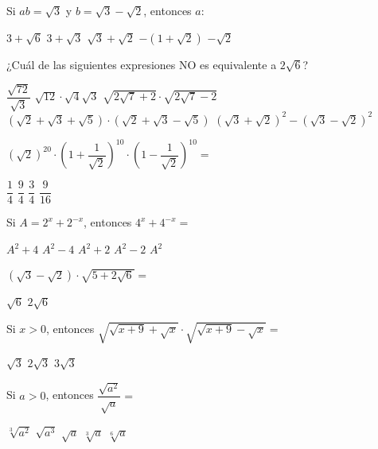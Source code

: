 \documentclass[pagina vacia]{srs}
\begin{document}
\begin{preguntas}
\pregunta Si \(ab = \sqrt{3}\) y \(b = \sqrt{3} - \sqrt{2}\), entonces \(a:\)
\begin{vertical}
\alternativa \(3 + \sqrt{6}\)
\alternativa \(3 + \sqrt{3}\)
\alternativa \(\sqrt{3} + \sqrt{2}\)
\alternativa \(-(1 + \sqrt{2})\)
\alternativa \(-\sqrt{2}\)
\end{vertical}

\pregunta ¿Cuál de las siguientes expresiones NO es equivalente a \(2\sqrt{6}\)?
\begin{vertical}
\alternativa \(\dfrac{\sqrt{72}}{\sqrt{3}}\)
\alternativa \(\sqrt{12} \cdot \sqrt{4}\sqrt{3}\)
\alternativa \(\sqrt{2\sqrt{7}+2} \cdot \sqrt{2\sqrt{7}-2}\)
\alternativa \((\sqrt{2}+\sqrt{3}+\sqrt{5}) \cdot (\sqrt{2}+\sqrt{3}-\sqrt{5})\)
\alternativa \((\sqrt{3}+\sqrt{2})^2 - (\sqrt{3}-\sqrt{2})^2\)
\end{vertical}

\pregunta \((\sqrt{2})^{20} \cdot \left(1 + \dfrac{1}{\sqrt{2}}\right)^{10} \cdot \left(1 - \dfrac{1}{\sqrt{2}}\right)^{10} =\)
\begin{vertical}
\alternativa \(\dfrac{1}{4}\)
\alternativa \(\dfrac{9}{4}\)
\alternativa \(\dfrac{3}{4}\)
\alternativa \(\dfrac{9}{16}\)
\end{vertical}

\pregunta Si \(A = 2^x + 2^{-x}\), entonces \(4^x + 4^{-x} =\)
\begin{vertical}
\alternativa \(A^2 + 4\)
\alternativa \(A^2 - 4\)
\alternativa \(A^2 + 2\)
\alternativa \(A^2 - 2\)
\alternativa \(A^2\)
\end{vertical}

\pregunta \((\sqrt{3}-\sqrt{2})\cdot\sqrt{5 + 2\sqrt{6}} =\)
\begin{vertical}
\alternativa \(\sqrt{6}\)
\alternativa \(2\sqrt{6}\)
\end{vertical}

\pregunta Si \(x > 0\), entonces \(\sqrt{\sqrt{x+9}+\sqrt{x}} \cdot \sqrt{\sqrt{x+9}-\sqrt{x}} =\)
\begin{vertical}
\alternativa \(\sqrt{3}\)
\alternativa \(2\sqrt{3}\)
\alternativa \(3\sqrt{3}\)
\end{vertical}

\pregunta Si \(a > 0\), entonces \(\dfrac{\sqrt{a^2}}{\sqrt{a}} =\)
\begin{vertical}
\alternativa \(\sqrt[3]{a^2}\)
\alternativa \(\sqrt{a^3}\)
\alternativa \(\sqrt{a}\)
\alternativa \(\sqrt[3]{a}\)
\alternativa \(\sqrt[6]{a}\)
\end{vertical}


\end{preguntas}
\end{document}
